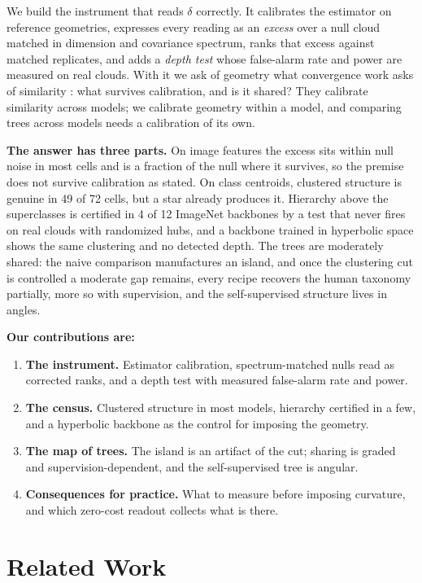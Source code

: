 \documentclass{article}
\theoremstyle{definition}
\theoremstyle{plain}
\theoremstyle{remark}
\begin{document}
We build the instrument that reads $\delta$ correctly. It calibrates the estimator on reference geometries, expresses every reading as an \emph{excess} over a null cloud matched in dimension and covariance spectrum, ranks that excess against matched replicates, and adds a \emph{depth test} whose false-alarm rate and power are measured on real clouds. With it we ask of geometry what convergence work asks of similarity \citep{huh2024platonic, groger2026aristotelian}: what survives calibration, and is it shared? They calibrate similarity across models; we calibrate geometry within a model, and comparing trees across models needs a calibration of its own.

\textbf{The answer has three parts.} On image features the excess sits within null noise in most cells and is a fraction of the null where it survives, so the premise does not survive calibration as stated. On class centroids, clustered structure is genuine in 49 of 72 cells, but a star already produces it. Hierarchy above the superclasses is certified in 4 of 12 ImageNet backbones by a test that never fires on real clouds with randomized hubs, and a backbone trained in hyperbolic space shows the same clustering and no detected depth. The trees are moderately shared: the naive comparison manufactures an island, and once the clustering cut is controlled a moderate gap remains, every recipe recovers the human taxonomy partially, more so with supervision, and the self-supervised structure lives in angles.

\textbf{Our contributions are:}
\begin{enumerate}[topsep=0pt,itemsep=1pt,leftmargin=*]
\item \textbf{The instrument.} Estimator calibration, spectrum-matched nulls read as corrected ranks, and a depth test with measured false-alarm rate and power.
\item \textbf{The census.} Clustered structure in most models, hierarchy certified in a few, and a hyperbolic backbone as the control for imposing the geometry.
\item \textbf{The map of trees.} The island is an artifact of the cut; sharing is graded and supervision-dependent, and the self-supervised tree is angular.
\item \textbf{Consequences for practice.} What to measure before imposing curvature, and which zero-cost readout collects what is there.
\end{enumerate}

\section{Related Work}
\label{sec:related}
\end{document}
